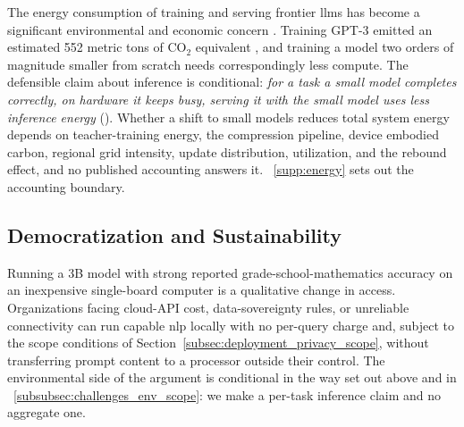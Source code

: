 The energy consumption of training and serving frontier \glspl{llm} has become a significant environmental and economic concern \citep{strubell2019energy,patterson2022carbon}. Training GPT-3 emitted an estimated 552 metric tons of CO$_2$ equivalent \citep{patterson2021carbon}, and training a model two orders of magnitude smaller from scratch needs correspondingly less compute. The defensible claim about inference is conditional: \emph{for a task a small model completes correctly, on hardware it keeps busy, serving it with the small model uses less inference energy} (\evD). Whether a shift to small models reduces total system energy depends on teacher-training energy, the compression pipeline, device embodied carbon, regional grid intensity, update distribution, utilization, and the rebound effect, and no published accounting answers it. \suppsec~\ref{supp:energy} sets out the accounting boundary.

\subsection{Democratization and Sustainability}
\label{supp:democratization}

Running a 3B model with strong reported grade-school-mathematics accuracy on an
inexpensive single-board computer is a qualitative change in access.
Organizations facing cloud-API cost, data-sovereignty rules, or unreliable
connectivity can run capable \gls{nlp} locally with no per-query charge and,
subject to the scope conditions of Section~\ref{subsec:deployment_privacy_scope},
without transferring prompt content to a processor outside their control. The
environmental side of the argument is conditional in the way set out above and in
\suppsec~\ref{subsubsec:challenges_env_scope}: we make a per-task inference claim
and no aggregate one.

